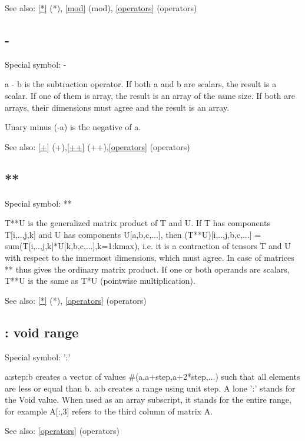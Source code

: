 \documentclass[a4paper]{article}
\begin{document}
See also: \ref{*} {(*)}, \ref{mod} {(mod)}, \ref{operators} {(operators)}




\subsection{-\label{-}}

Special symbol: -

a - b is the subtraction operator. If both a and b are scalars, the
result is a scalar. If one of them is array, the result is an array of
the same size. If both are arrays, their dimensions must agree and the
result is an array.

Unary minus (-a) is the negative of a.

See also: \ref{+} {(+)},\ref{++} {(++)},\ref{operators} {(operators)}




\subsection{**\label{**}}

Special symbol: **

T**U is the generalized matrix product of T and U.
If T has components T{[}i,..,j,k] and U has components U{[}a,b,c,...],
then (T**U){[}i,..,j,b,c,...] = sum(T{[}i,..,j,k]*U{[}k,b,c,...],k=1:kmax),
i.e. it is a contraction of tensors T and U with respect to the
innermost dimensions, which must agree. In case of matrices ** thus
gives the ordinary matrix product. If one or both operands are scalars,
T**U is the same as T*U (pointwise multiplication).

See also: \ref{*} {(*)}, \ref{operators} {(operators)}




\subsection{: void range\label{:}}

Special symbol: ':'

a:step:b creates a vector of values \#(a,a+step,a+2*step,...) such that
all elements are less or equal than b. a:b creates a range using unit
step. A lone ':' stands for the Void value. When used as an array
subscript, it stands for the entire range, for example A{[}:,3] refers
to the third column of matrix A.

See also: \ref{operators} {(operators)}
\end{document}
